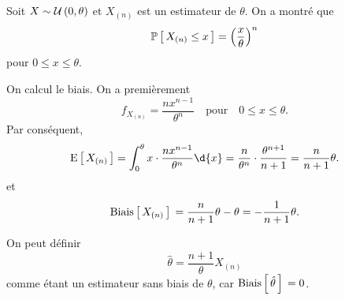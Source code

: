 \documentclass[11pt]{article}
\renewcommand\P[1]{%
	\ensuremath{%
		\mathbb{P}\left[\,#1\,\right]%
	}%
}%
\newcommand\Uni[2]{%
	\ensuremath{%
		\mathcal{U}\left(#1,#2\right)%
	}%
}%
\newcommand\Esp[1]{%
	\ensuremath{%
		\mathrm{E}\left[\,#1\,\right]%
	}%
}%
\newcommand\Biais[1]{%
	\ensuremath{%
		\mathrm{Biais}\left[\,#1\,\right]\,%
	}%
}%
\theoremstyle{remark}
\theoremstyle{definition}
\begin{document}
\begin{exemple}
	Soit $X\sim\Uni{0}{\theta}$ et $X_{(n)}$ est un estimateur de $\theta$. On
	a montré que
	\begin{equation*}
		\P{X_{(n)}\leq x}=\left(\frac{x}{\theta}\right)^n
	\end{equation*}
	pour $0\leq x\leq\theta$.

	On calcul le biais. On a premièrement
	\begin{equation*}
		f_{X_{(n)}}=\frac{nx^{n-1}}{\theta^n}
		\quad\text{pour}\quad 0\leq x\leq\theta.
	\end{equation*}
	Par conséquent,
	\begin{equation*}
		\Esp{X_{(n)}}
		=\int_0^\theta x\cdot\frac{nx^{n-1}}{\theta^n}\d{x}
		=\frac{n}{\theta^n}\cdot\frac{\theta^{n+1}}{n+1}
		=\frac{n}{n+1}\theta.
	\end{equation*}
	et
	\begin{equation*}
		\Biais{X_{(n)}}
		=\frac{n}{n+1}\theta-\theta
		=-\frac{1}{n+1}\theta.
	\end{equation*}

	On peut définir
	\begin{equation*}
		\hat{\theta}=\frac{n+1}{\theta}X_{(n)}
	\end{equation*}
	comme étant un estimateur sans biais de $\theta$, car 
	$\Biais{\hat{\theta}}=0$.
\end{exemple}
\end{document}
